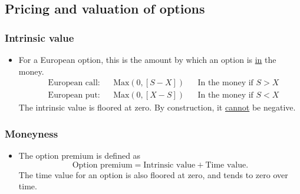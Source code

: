 \documentclass[../notes_compiled.tex]{subfiles}
\begin{document}
\subsection{Pricing and valuation of options}
\subsubsection*{Intrinsic value}
\begin{itemize}
\item For a European option, this is the amount by which an option is \underline{in} the money.
\begin{align*}
&\text{European call:} & &\text{Max}\left(0, [S-X]\right) & &\text{In the money if }S>X \\
&\text{European put:} & &\text{Max}\left(0, [X-S]\right) & &\text{In the money if }S<X
\end{align*}
The intrinsic value is floored at zero. By construction, it \underline{cannot} be negative.
\end{itemize}

\subsubsection*{Moneyness}
\begin{itemize}
\item The option premium is defined as
\begin{equation}
\text{Option premium} = \text{Intrinsic value} + \text{Time value}.
\end{equation}
The time value for an option is also floored at zero, and tends to zero over time.
\end{itemize}
\end{document}
